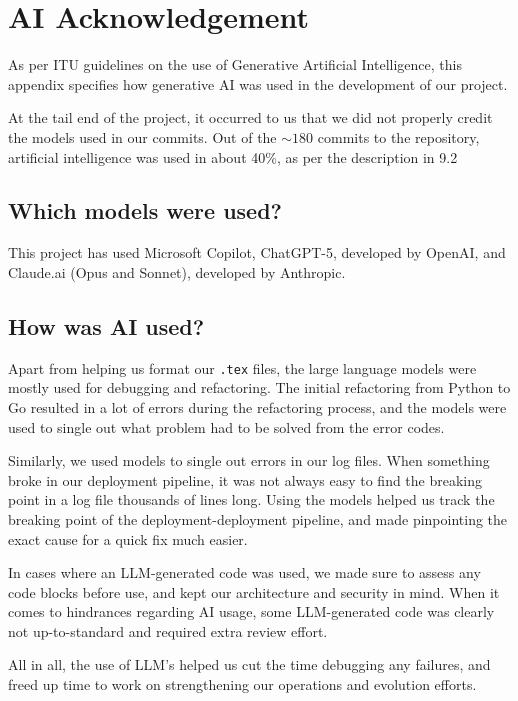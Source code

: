 \section{AI Acknowledgement}

As per ITU guidelines on the use of Generative Artificial Intelligence, this appendix specifies how generative AI was used in the development of our project.

At the tail end of the project, it occurred to us that we did not properly credit the models used in our commits. Out of the $\sim180$ commits to the repository, artificial intelligence was used in about 40\%, as per the description in 9.2


\subsection{Which models were used?}
This project has used Microsoft Copilot, ChatGPT-5, developed by OpenAI, and Claude.ai (Opus and Sonnet), developed by Anthropic.

\subsection{How was AI used?}
Apart from helping us format our \texttt{.tex} files, the large language models were mostly used for debugging and refactoring. The initial refactoring from Python to Go resulted in a lot of errors during the refactoring process, and the models were used to single out what problem had to be solved from the error codes. 

Similarly, we used models to single out errors in our log files. When something broke in our deployment pipeline, it was not always easy to find the breaking point in a log file thousands of lines long. Using the models helped us track the breaking point of the deployment-deployment pipeline, and made pinpointing the exact cause for a quick fix much easier. 

In cases where an LLM-generated code was used, we made sure to assess any code blocks before use, and kept our architecture and security in mind. When it comes to hindrances regarding AI usage, some LLM-generated code was clearly not up-to-standard and required extra review effort.

All in all, the use of LLM's helped us cut the time debugging any failures, and freed up time to work on strengthening our operations and evolution efforts.